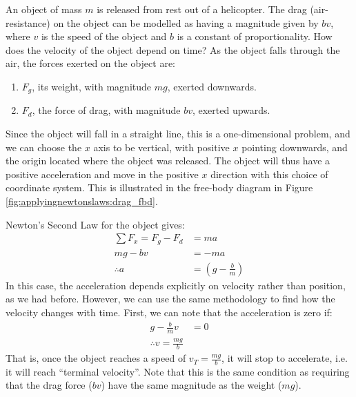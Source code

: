 \begin{example}{An object of mass $m$ is released from rest out of a helicopter. The drag (air-resistance) on the object can be modelled as having a magnitude given by $bv$, where $v$ is the speed of the object and $b$ is a constant of proportionality. How does the velocity of the object depend on time?}
\label{ex:applyingnewtonslaws:drag}
As the object falls through the air, the forces exerted on the object are:
\begin{enumerate}
\item $F_g$, its weight, with magnitude $mg$, exerted downwards.
\item $F_d$, the force of drag, with magnitude $bv$, exerted upwards. 
\end{enumerate}
Since the object will fall in a straight line, this is a one-dimensional problem, and we can choose the $x$ axis to be vertical, with positive $x$ pointing downwards, and the origin located where the object was released. The object will thus have a positive acceleration and move in the positive $x$ direction with this choice of coordinate system. This is illustrated in the free-body diagram in Figure \ref{fig:applyingnewtonslaws:drag_fbd}.

Newton's Second Law for the object gives:
\begin{align*}
\sum F_x = F_g - F_d &= ma\\
mg - bv &= -ma\\
\therefore a &= \left (g-\frac{b}{m} \right)
\end{align*}
In this case, the acceleration depends explicitly on velocity rather than position, as we had before. However, we can use the same methodology to find how the velocity changes with time. First, we can note that the acceleration is zero if:
\begin{align*}
g-\frac{b}{m}v &=0\\
\therefore v = \frac{mg}{b}
\end{align*}
That is, once the object reaches a speed of $v_{T}=\frac{mg}{b}$, it will stop to accelerate, i.e. it will reach ``terminal velocity''. Note that this is the same condition as requiring that the drag force ($bv$) have the same magnitude as the weight ($mg$).


\end{example}
